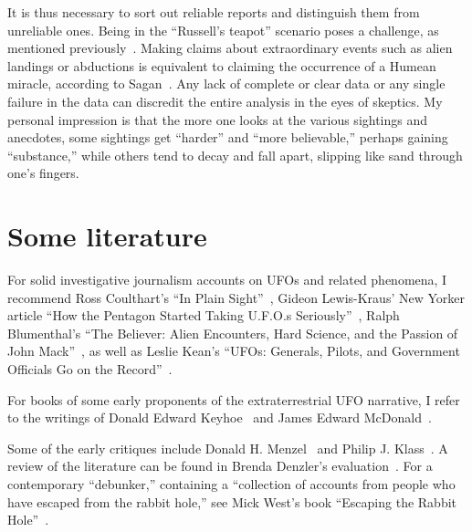 It is thus necessary to sort out reliable reports and distinguish them from unreliable ones. Being in the ``Russell's teapot'' scenario poses a challenge, as mentioned previously~\cite{Russell1952,Loewe-Christmas}. Making claims about extraordinary events such as alien landings or abductions is equivalent to claiming the occurrence of a Humean miracle, according to Sagan~\cite{Deming_2016}.
Any lack of complete or clear data or any single failure in the data can discredit the entire analysis in the eyes of skeptics.
My personal impression is that the more one looks at the various sightings and anecdotes, some sightings get ``harder'' and ``more believable,'' perhaps gaining ``substance,'' while others tend to decay and fall apart, slipping like sand through one's fingers.

\section{Some literature}


For solid investigative journalism accounts on UFOs and related phenomena, I recommend
Ross  Coulthart's ``In Plain Sight''~\cite{Coulthart2021Aug},
Gideon Lewis-Kraus' New Yorker article ``How the Pentagon Started Taking {U.F.O.}s Seriously''~\cite{Lewis-Kraus2021Apr},
Ralph Blumenthal's ``The Believer: Alien Encounters, Hard Science, and the Passion of John Mack''~\cite{Blumenthal2021Mar},
as well as Leslie Kean's ``UFOs: Generals, Pilots, and Government Officials Go on the Record''~\cite{Kean2011Aug}.


For books of some early proponents of the extraterrestrial UFO narrative, I refer to the writings of
Donald Edward  Keyhoe~\cite{Keyhoe1950,Keyhoe1953,Keyhoe1955}
and James Edward McDonald~\cite{McDonald2022Aug,Druffel2003Sep}.

Some of the early critiques include
Donald H. Menzel~\cite{Menzel_1953,BoydMenzel1963Jan} and
Philip J. Klass~\cite{Klass1975Jan,Klass1983Jan}.
A review of the literature can be found in Brenda Denzler's evaluation~\cite[p.~78]{Denzler_2001}.
For a contemporary ``debunker,''
containing a ``collection of accounts from people who have escaped from the rabbit hole,'' see Mick West's book ``Escaping the Rabbit Hole''~\cite{West2018Apr}.


